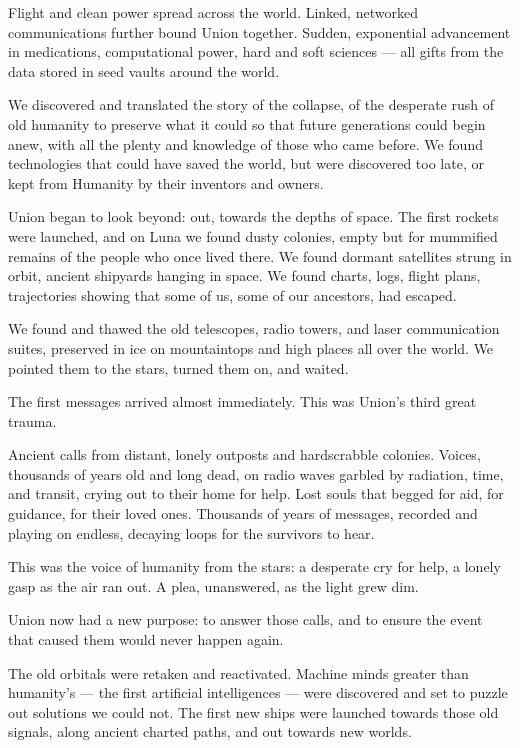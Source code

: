 Flight and clean power spread across the world. Linked, networked communications further
bound Union together. Sudden, exponential advancement in medications, computational power,
hard and soft sciences — all gifts from the data stored in seed vaults around the world.

We discovered and translated the story of the collapse, of the desperate rush of old humanity to
preserve what it could so that future generations could begin anew, with all the plenty and
knowledge of those who came before. We found technologies that could have saved the world,
but were discovered too late, or kept from Humanity by their inventors and owners.

Union began to look beyond: out, towards the depths of space. The first rockets were launched,
and on Luna we found dusty colonies, empty but for mummified remains of the people who once
lived there. We found dormant satellites strung in orbit, ancient shipyards hanging in space. We
found charts, logs, flight plans, trajectories showing that some of us, some of our ancestors, had
escaped.

We found and thawed the old telescopes, radio towers, and laser communication suites,
preserved in ice on mountaintops and high places all over the world. We pointed them to the
stars, turned them on, and waited.

The first messages arrived almost immediately. This was Union’s third great trauma.

Ancient calls from distant, lonely outposts and hardscrabble colonies. Voices, thousands of years
old and long dead, on radio waves garbled by radiation, time, and transit, crying out to their
home for help. Lost souls that begged for aid, for guidance, for their loved ones. Thousands of
years of messages, recorded and playing on endless, decaying loops for the survivors to hear.

This was the voice of humanity from the stars: a desperate cry for help, a lonely gasp as the air
ran out. A plea, unanswered, as the light grew dim.

Union now had a new purpose: to answer those calls, and to ensure the event that caused them
would never happen again.

The old orbitals were retaken and reactivated. Machine minds greater than humanity’s — the first
artificial intelligences — were discovered and set to puzzle out solutions we could not. The first
new ships were launched towards those old signals, along ancient charted paths, and out
towards new worlds.

